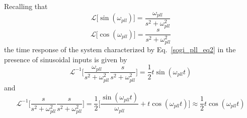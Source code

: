 \documentclass[11pt,a4paper,oneside]{book}
\numberwithin{equation}{section}
\theoremstyle{it}
\theoremstyle{definition}
\begin{document}
Recalling that
\begin{equation}
	\mathscr{L}\Big[\sin(\omega_{pll})\Big]=\frac{\omega_{pll}}{s^2+\omega_{pll}^2}
\end{equation}
\begin{equation}
	\mathscr{L}\Big[\cos(\omega_{pll})\Big]=\frac{s}{s^2+\omega_{pll}^2}
\end{equation}
the time response of the system characterized by Eq.~\eqref{sogi_pll_eq2} in the presence of sinusoidal inputs is given by
\begin{equation}
	\mathscr{L}^{-1}\Bigg[\frac{\omega_{pll}}{s^2+\omega_{pll}^2}\frac{s}{s^2+\omega_{pll}^2}\Bigg]=\frac{1}{2}t\sin(\omega_{pll}t)
\end{equation}
and
\begin{equation}
	\mathscr{L}^{-1}\Bigg[\frac{s}{s^2+\omega_{pll}^2}\frac{s}{s^2+\omega_{pll}^2}\Bigg]=\frac{1}{2}\Bigg[\frac{\sin(\omega_{pll}t)}{\omega_{pll}}+t\cos(\omega_{pll}t)\Bigg]\approx\frac{1}{2}t\cos(\omega_{pll}t)
\end{equation}
\end{document}
